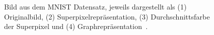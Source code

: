 \begin{figure}[t]
\centering
{}
\caption[\gls{MNIST}]{Bild aus dem \gls{MNIST} Datensatz, jeweils dargestellt als (1) Originalbild, (2) Superpixelrepräsentation, (3) Durchschnittsfarbe der Superpixel und (4) Graphrepräsentation~\cite{mnist}.}
\label{fig:mnist}
\end{figure}

